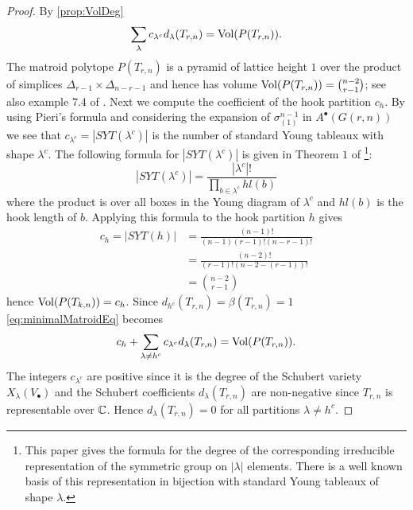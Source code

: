 \begin{proof}
    By \cref{prop:VolDeg}
    \begin{equation}
        \label{eq:minimalMatroidEq}
        \sum_\lambda c_{\lambda^c} d_\lambda(T_{r,n}) = \operatorname{\mathrm{Vol}}(P(T_{r,n})).
    \end{equation}
    The matroid polytope $P(T_{r,n})$ is a pyramid of lattice height $1$ over the product of simplices $\Delta_{r-1} \times \Delta_{n-r-1}$ and hence has volume $\operatorname{\mathrm{Vol}}(P(T_{r,n})) = \binom{n-2}{r-1}$; see also example 7.4 of \cite{FerSch}. Next we compute the coefficient of the hook partition $c_h$. By using Pieri's formula and considering the expansion of $\sigma_{(1)}^{n-1}$ in $A^\bullet(G(r,n))$ we see that $c_{\lambda^c} = |SYT(\lambda^c)|$ is the number of standard Young tableaux with shape $\lambda^c$. The following formula for $|SYT(\lambda^c)|$ is given in Theorem $1$ of \cite{FrameRobinsonThrall}\footnote{This paper gives the formula for the degree of the corresponding irreducible representation of the symmetric group on $|\lambda|$ elements. There is a well known basis of this representation in bijection with standard Young tableaux of shape $\lambda$.}:
    \begin{equation*}
        |SYT(\lambda^c)| = \frac{|\lambda^c|!}{\prod_{b\in \lambda^c} hl(b)}
    \end{equation*}
    where the product is over all boxes in the Young diagram of $\lambda^c$ and $hl(b)$ is the hook length of $b$. Applying this formula to the hook partition $h$ gives
    \begin{align*}
        c_h = |SYT(h)| &= \frac{(n-1)!}{(n-1)(r-1)!(n-r-1)!}\\
        &= \frac{(n-2)!}{(r-1)!(n-2 -(r-1))!}\\
        &= \binom{n-2}{r-1}
    \end{align*}
    hence $\operatorname{\mathrm{Vol}}(P(T_{k,n})) = c_h$. Since $d_{h^c}(T_{r,n}) = \beta(T_{r,n}) = 1$ \cref{eq:minimalMatroidEq} becomes
    \begin{equation*}
        c_h + \sum_{\lambda\neq h^c} c_{\lambda^c}d_\lambda(T_{r,n}) = \operatorname{\mathrm{Vol}}(P(T_{r,n})).
    \end{equation*}
    The integers $c_{\lambda^c}$ are positive since it is the degree of the Schubert variety $X_\lambda(V_\bullet)$ and the Schubert coefficients $d_\lambda(T_{r,n})$ are non-negative since $T_{r,n}$ is representable over ${\mathbb C}$. Hence $d_\lambda(T_{r,n}) = 0$ for all partitions $\lambda \neq h^c$.
\end{proof}

